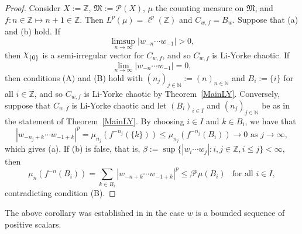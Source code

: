 \documentclass[12pt]{amsart}
\theoremstyle{theorem}
\theoremstyle{definition}
\theoremstyle{remark} \theoremstyle{question} \theoremstyle{example}
\newcommand{\N}{\mathbb{N}}
\newcommand{\Z}{\mathbb{Z}}
\newcommand{\cP}{\mathcal{P}}
\newcommand{\fM}{\mathfrak{M}}
\DeclareRobustCommand{\rchi}{{\mathpalette\irchi\relax}}
\newcommand{\irchi}[2]{\raisebox{\depth}{$#1\chi$}}
\begin{document}
\begin{proof}
Consider $X\!:= \Z$, $\fM\!:= \cP(X)$, $\mu$ the counting measure on $\fM$, and $f : n \in \Z \mapsto n+1 \in \Z$.
Then $L^p(\mu) = \ell^p(\Z)$ and $C_{w,f} = B_w$. Suppose that (a) and (b) hold. If
\[
\limsup_{n \to \infty} |w_{-n} \cdots w_{-1}| > 0,
\]
then $\rchi_{\{0\}}$ is a semi-irregular vector for $C_{w,f}$, and so $C_{w,f}$ is Li-Yorke chaotic. If
\[
\lim_{n \to \infty} |w_{-n} \cdots w_{-1}| = 0,
\]
then conditions (A) and (B) hold with $(n_j)_{j \in \N}\!:= (n)_{n \in \N}$ and $B_i\!:= \{i\}$ for all $i \in \Z$, and so $C_{w,f}$ is Li-Yorke chaotic by Theorem~\ref{MainLY}.
Conversely, suppose that $C_{w,f}$ is Li-Yorke chaotic and let $(B_i)_{i \in I}$ and $(n_j)_{j \in \N}$ be as in the statement of Theorem~\ref{MainLY}.
By choosing $i \in I$ and $k \in B_i$, we have that
\[
|w_{-n_j + k} \cdots w_{-1 + k}|^p = \mu_{n_j}(f^{-n_j}(\{k\})) \leq \mu_{n_j}(f^{-n_j}(B_i)) \to 0 \text{ as } j \to \infty,
\]
which gives (a). If (b) is false, that is, $\beta\!:= \sup\{|w_i \cdots w_j| : i,j \in \Z, i \leq j\} < \infty$, then
\[
\mu_n(f^{-n}(B_i)) = \sum_{k \in B_i} |w_{-n+k} \cdots w_{-1+k}|^p \leq \beta^p \mu(B_i) \ \ \text{ for all } i \in I,
\]
contradicting condition (B).
\end{proof}

The above corollary was established in \cite[Corollary~1.6]{BerDarPir20} in the case $w$ is a bounded sequence of positive scalars.
\end{document}
